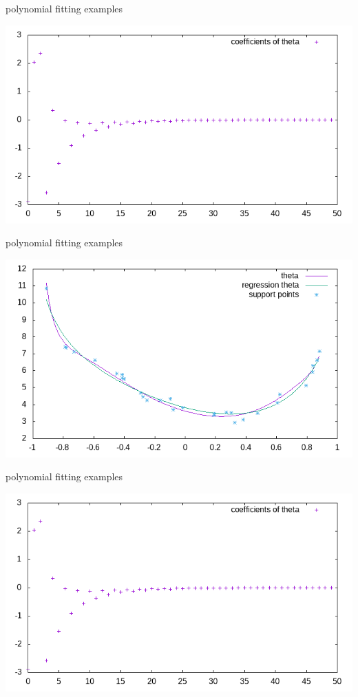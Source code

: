 \documentclass{beamer}
\begin{document}
\begin{frame}{polynomial fitting examples}
\begin{center}
\includegraphics[scale=0.6]{source/theta_coefficients_1.png}
\end{center}
\end{frame}

\begin{frame}{polynomial fitting examples}
\begin{center}
\includegraphics[scale=0.6]{source/theta_plot_2.png}
\end{center}
\end{frame}

\begin{frame}{polynomial fitting examples}
\begin{center}
\includegraphics[scale=0.6]{source/theta_coefficients_1.png}
\end{center}
\end{frame}
\end{document}

